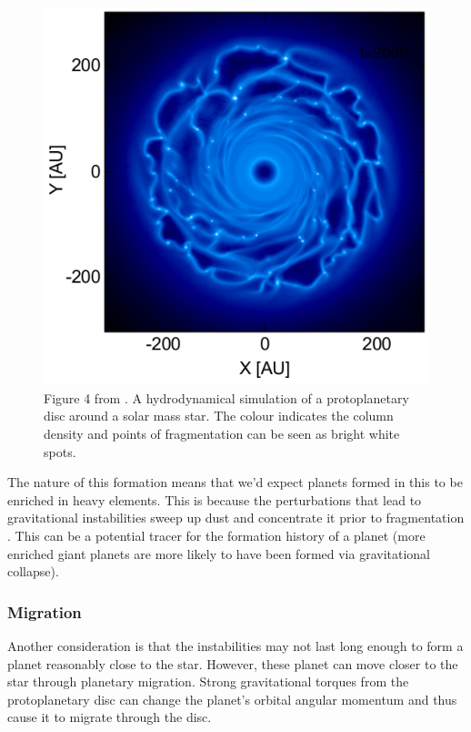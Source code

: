 \documentclass[twocolumn]{aastex631}
\begin{document}
\begin{figure}
    \centering
    \includegraphics[width=\columnwidth]{fragmentation.png}
    \caption{Figure 4 from \citet{Forgan+2017}. A hydrodynamical simulation of a protoplanetary disc around a solar mass star. The colour indicates the column density and points of fragmentation can be seen as bright white spots.}
    \label{fig:fragmentation}
\end{figure}

The nature of this formation means that we'd expect planets formed in this to be enriched in heavy elements. This is because the perturbations that lead to gravitational instabilities sweep up dust and concentrate it prior to fragmentation \citep{Kratter+2016}. This can be a potential tracer for the formation history of a planet (more enriched giant planets are more likely to have been formed via gravitational collapse).

\subsubsection{Migration}

Another consideration is that the instabilities may not last long enough to form a planet reasonably close to the star. However, these planet can move closer to the star through planetary migration. Strong gravitational torques from the protoplanetary disc can change the planet's orbital angular momentum and thus cause it to migrate through the disc.
\end{document}

